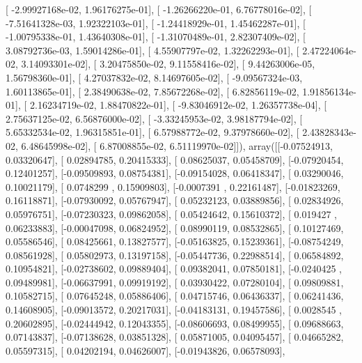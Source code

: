 \documentclass{article}
\begin{document}
       [ -2.99927168e-02,   1.96176275e-01],
       [ -1.26266220e-01,   6.76778016e-02],
       [ -7.51641328e-03,   1.92322103e-01],
       [ -1.24418929e-01,   1.45462287e-01],
       [ -1.00795338e-01,   1.43640308e-01],
       [ -1.31070489e-01,   2.82307409e-02],
       [  3.08792736e-03,   1.59014286e-01],
       [  4.55907797e-02,   1.32262293e-01],
       [  2.47224064e-02,   3.14093301e-02],
       [  3.20475850e-02,   9.11558416e-02],
       [  9.44263006e-05,   1.56798360e-01],
       [  4.27037832e-02,   8.14697605e-02],
       [ -9.09567324e-03,   1.60113865e-01],
       [  2.38490638e-02,   7.85672268e-02],
       [  6.82856119e-02,   1.91856134e-01],
       [  2.16234719e-02,   1.88470822e-01],
       [ -9.83046912e-02,   1.26357738e-04],
       [  2.75637125e-02,   6.56876000e-02],
       [ -3.33245953e-02,   3.98187794e-02],
       [  5.65332534e-02,   1.96315851e-01],
       [  6.57988772e-02,   9.37978660e-02],
       [  2.43828343e-02,   6.48645998e-02],
       [  6.87008855e-02,   6.51119970e-02]]), array([[-0.07524913,  0.03320647],
       [ 0.02894785,  0.20415333],
       [ 0.08625037,  0.05458709],
       [-0.07920454,  0.12401257],
       [-0.09509893,  0.08754381],
       [-0.09154028,  0.06418347],
       [ 0.03290046,  0.10021179],
       [ 0.0748299 ,  0.15909803],
       [-0.0007391 ,  0.22161487],
       [-0.01823269,  0.16118871],
       [-0.07930092,  0.05767947],
       [ 0.05232123,  0.03889856],
       [ 0.02834926,  0.05976751],
       [-0.07230323,  0.09862058],
       [ 0.05424642,  0.15610372],
       [ 0.019427  ,  0.06233883],
       [-0.00047098,  0.06824952],
       [ 0.08990119,  0.08532865],
       [ 0.10127469,  0.05586546],
       [ 0.08425661,  0.13827577],
       [-0.05163825,  0.15239361],
       [-0.08754249,  0.08561928],
       [ 0.05802973,  0.13197158],
       [-0.05447736,  0.22988514],
       [ 0.06584892,  0.10954821],
       [-0.02738602,  0.09889404],
       [ 0.09382041,  0.07850181],
       [-0.0240425 ,  0.09489981],
       [-0.06637991,  0.09919192],
       [ 0.03930422,  0.07280104],
       [ 0.09809881,  0.10582715],
       [ 0.07645248,  0.05886406],
       [ 0.04715746,  0.06436337],
       [ 0.06241436,  0.14608905],
       [-0.09013572,  0.20217031],
       [-0.04183131,  0.19457586],
       [ 0.0028545 ,  0.20602895],
       [-0.02444942,  0.12043355],
       [-0.08606693,  0.08499955],
       [ 0.09688663,  0.07143837],
       [-0.07138628,  0.03851328],
       [ 0.05871005,  0.04095457],
       [ 0.04665282,  0.05597315],
       [ 0.04202194,  0.04626007],
       [-0.01943826,  0.06578093],
\end{document}

